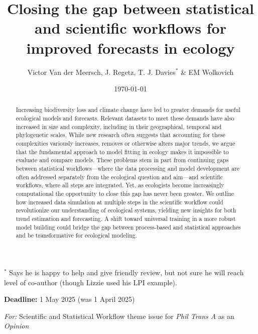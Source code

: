 \documentclass[11pt]{article}
\begin{document}
\title{Closing the gap between statistical and scientific workflows for improved forecasts in ecology } 
\date{\today}
\author{Victor Van der Meersch, J. Regetz, T. J. Davies$^*$ \& EM Wolkovich}
\maketitle
$^*$ Says he is happy to help and give friendly review, but not sure he will reach level of co-author (though Lizzie used his LPI example). 

{\bf Deadline:} 1 May 2025 (was 1 April 2025)

\emph{For:} Scientific and Statistical Workflow theme issue for \emph{Phil Trans A} as an \emph{Opinion}


\begin{abstract}
Increasing biodiversity loss and climate change have led to greater demands for useful ecological models and forecasts. Relevant datasets to meet these demands have also increased in size and complexity, including in their geographical, temporal and phylogenetic scales. While new research often suggests that accounting for these complexities variously increases, removes or otherwise alters major trends, we argue that the fundamental approach to model fitting in ecology makes it impossible to evaluate and compare models. These problems stem in part from continuing gaps between statistical workflows---where the data processing and model development are often addressed separately from the ecological question and aim---and scientific workflows, where all steps are integrated. Yet, as ecologists become increasingly computational the opportunity to close this gap has never been greater. We outline how increased data simulation at multiple steps in the scientific workflow could revolutionize our understanding of ecological systems, yielding new insights for both trend estimation and forecasting.
A shift toward universal training in a more robust model building could bridge the gap between process-based and statistical approaches and be transformative for ecological modeling.
\end{abstract}
\end{document}
